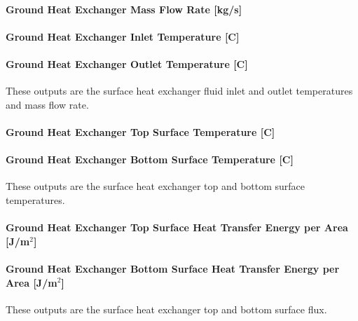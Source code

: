 \paragraph{Ground Heat Exchanger Mass Flow Rate {[}kg/s{]}}\label{ground-heat-exchanger-mass-flow-rate-kgs-2}

\paragraph{Ground Heat Exchanger Inlet Temperature {[}C{]}}\label{ground-heat-exchanger-inlet-temperature-c-2}

\paragraph{Ground Heat Exchanger Outlet Temperature {[}C{]}}\label{ground-heat-exchanger-outlet-temperature-c-2}

These outputs are the surface heat exchanger fluid inlet and outlet temperatures and mass flow rate.

\paragraph{Ground Heat Exchanger Top Surface Temperature {[}C{]}}\label{ground-heat-exchanger-top-surface-temperature-c}

\paragraph{Ground Heat Exchanger Bottom Surface Temperature {[}C{]}}\label{ground-heat-exchanger-bottom-surface-temperature-c}

These outputs are the surface heat exchanger top and bottom surface temperatures.

\paragraph{Ground Heat Exchanger Top Surface Heat Transfer Energy per Area~ {[}J/m\(^{2}\){]}}\label{ground-heat-exchanger-top-surface-heat-transfer-energy-per-area-jm2}

\paragraph{Ground Heat Exchanger Bottom Surface Heat Transfer Energy per Area {[}J/m\(^{2}\){]}}\label{ground-heat-exchanger-bottom-surface-heat-transfer-energy-per-area-jm2}

These outputs are the surface heat exchanger top and bottom surface flux.

